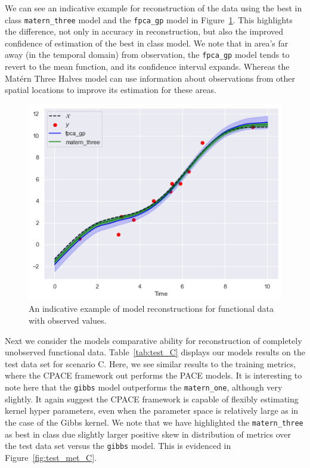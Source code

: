 We can see an indicative example for reconstruction of the data using the best in class \verb*|matern_three| model and the \verb*|fpca_gp| model in Figure~\ref{fig:sim_val_recon_C}.
This highlights the difference, not only in accuracy in reconstruction, but also the improved confidence of estimation of the best in class model.
We note that in area's far away (in the temporal domain) from observation, the \verb*|fpca_gp| model tends to revert to the mean function, and its confidence interval expands.
Whereas the Mat\'ern Three Halves model can use information about observations from other spatial locations to improve its estimation for these areas.

\begin{figure}
	\centering
	\includegraphics[width=\textwidth]{sim_val_recon_C}
	\caption{An indicative example of model reconstructions for functional data with observed values.}
	\label{fig:sim_val_recon_C}
\end{figure}

Next we consider the models comparative ability for reconstruction of completely unobserved functional data.
Table~\ref{tab:test_C} displays our models results on the test data set for scenario C.
Here, we see similar results to the training metrics, where the CPACE framework out performs the PACE models.
It is interesting to note here that the \verb*|gibbs| model outperforms the \verb*|matern_one|, although very slightly.
It again suggest the CPACE framework is capable of flexibly estimating kernel hyper parameters, even when the parameter space is relatively large as in the case of the Gibbs kernel.
We note that we have highlighted the \verb*|matern_three| as best in class due slightly larger positive skew in distribution of metrics over the test data set versus the \verb*|gibbs| model. 
This is evidenced in Figure~\ref{fig:test_met_C}.


